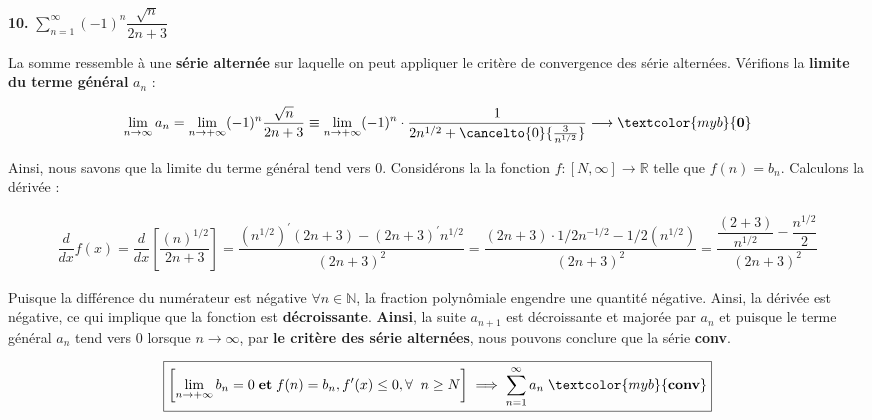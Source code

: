 \documentclass{report}
\begin{document}
    \vspace{1em}%
    \noindent
    \textbf{10.} $\sum_{n=1}^{\infty }(-1)^n\dfrac{\sqrt{n}}{2n +3}$   

    La somme ressemble à une \textbf{série alternée} sur laquelle on peut
    appliquer le critère de convergence des série alternées. 
    Vérifions la \textbf{limite du terme général}  $a_n$ : 

    \begin{align*}
        \lim\limits_{n\to \infty}a_n =  
        \lim\limits_{n \to+\infty } (-1)^n\dfrac{\sqrt{n}}{2n +3} \equiv
        \lim\limits_{n \to +\infty }
        (-1)^n \cdot \frac{1}{2n^{1/2} + 
        \cancelto{0}{\frac{3}{n^{1/2}} }}
        \longrightarrow  \textcolor{myb}{\textbf{0}}  
    \end{align*}

    Ainsi, nous savons que la limite du terme général tend vers 0. 
    Considérons la la fonction $f : [N, \infty] \rightarrow \mathbb{R}$
    telle que $f(n) = b_n$. Calculons la dérivée :

    \begin{align*}
        \dfrac{d}{dx}f(x) = \dfrac{d}{dx}
        \left[ \dfrac{(n)^{1/2}}{2n +3}\right]
        =
        \dfrac{\left( n^{1/2}\right)^{\prime}(2n +3) 
        - (2n + 3)^{\prime}n^{1/2}}{(2n + 3)^2} 
        = 
        \dfrac{(2n+3)\cdot 1/2n^{-1/2} -1/2(n^{1/2})}{(2n +3)^2} 
        = 
        \dfrac{\dfrac{(2 + 3)}{n^{1/2}} - \dfrac{n^{1/2}}{2}}{(2n +3)^2} 
    \end{align*}


    Puisque la différence du numérateur est négative 
    $\forall n \in \mathbb{N}$, la fraction polynômiale engendre 
    une quantité négative. Ainsi, la dérivée est négative, ce 
    qui implique que la fonction est \textbf{décroissante}.   
    \textbf{Ainsi}, la suite $a_{n+1}$ est décroissante et majorée 
    par $a_n$ et puisque le terme général $a_n$ tend vers 
    0 lorsque $n \longrightarrow \infty$, par 
    \textbf{le critère des série alternées}, nous pouvons conclure 
    que la série \textcolor{myb}{\textbf{conv}}. 

    \begin{align*}
        \boxed{ 
        \left[
        \lim\limits_{n \to+\infty }b_n = 0 
        \; 
        \textbf{et}
        \; 
        f(n) = b_n, f^{\prime}(x) \leq 0, \forall \;\; n \geq N 
    \right] 
    \implies \sum_{n=1}^{\infty }a_n \; \textcolor{myb}{\textbf{conv}} 
    }
    \end{align*}
\end{document}
